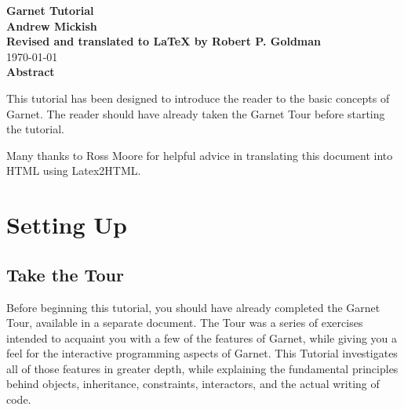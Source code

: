 
\begin{titlepage}
\vspace{0.6in}

\begin{center} 

\Large{\textbf{Garnet Tutorial}} \\

\large{{\bf Andrew Mickish}}  \\
\textbf{Revised and translated to LaTeX by Robert P. Goldman}\\

\today{} \\
{\bf Abstract}
\end{center}
  This tutorial has been designed to introduce the reader to the basic
  concepts of Garnet.  The reader should have already taken the Garnet
  Tour before starting the tutorial.
  \vspace{\fill}
  

  Many thanks to Ross Moore for helpful advice in translating this
  document into HTML using Latex2HTML.

\end{titlepage}

\tableofcontents{}


% 

\chapter{Setting Up}

\section{Take the Tour}

Before beginning this tutorial, you should have already completed the
Garnet Tour, available in a separate document.  The Tour was a series
of exercises intended to acquaint you with a few of the features of
Garnet, while giving you a feel for the interactive programming aspects
of Garnet.  This Tutorial investigates all of those features in
greater depth, while explaining the fundamental principles behind
objects, inheritance, constraints, interactors, and the actual writing
of code.

